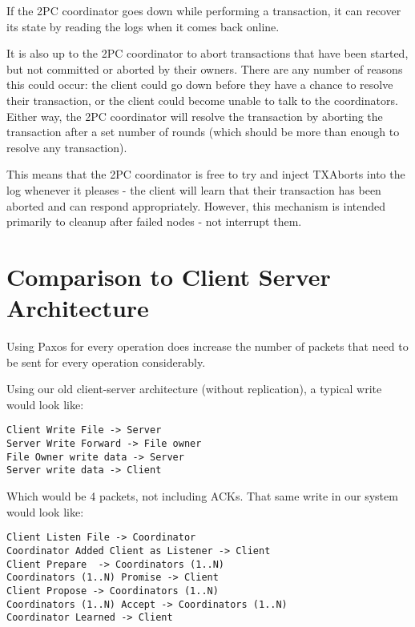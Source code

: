 \documentclass[11pt]{article}
\begin{document}
If the 2PC coordinator goes down while performing a transaction, it can recover its state by reading the logs when it comes back online.

It is also up to the 2PC coordinator to abort transactions that have been started, but not committed or aborted by their owners. There are any number of reasons this could occur: the client could go down before they have a chance to resolve their transaction, or the client could become unable to talk to the coordinators. Either way, the 2PC coordinator will resolve the transaction by aborting the transaction after a set number of rounds (which should be more than enough to resolve any transaction).

This means that the 2PC coordinator is free to try and inject TXAborts into the log whenever it pleases - the client will learn that their transaction has been aborted and can respond appropriately. However, this mechanism is intended primarily to cleanup after failed nodes - not interrupt them.

\section{Comparison to Client Server Architecture}



Using Paxos for every operation does increase the number of packets that need to be sent for every operation considerably.

Using our old client-server architecture (without replication), a typical write would look like:

\begin{verbatim}
Client Write File -> Server
Server Write Forward -> File owner
File Owner write data -> Server
Server write data -> Client
\end{verbatim}

Which would be 4 packets, not including ACKs. That same write in our system would look like:

\begin{verbatim}
Client Listen File -> Coordinator
Coordinator Added Client as Listener -> Client
Client Prepare  -> Coordinators (1..N)
Coordinators (1..N) Promise -> Client
Client Propose -> Coordinators (1..N)
Coordinators (1..N) Accept -> Coordinators (1..N)
Coordinator Learned -> Client
\end{verbatim}
\end{document}

